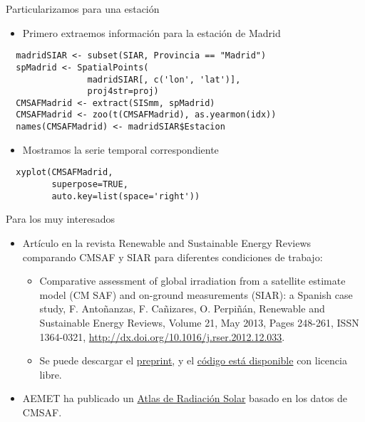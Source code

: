 \documentclass[xcolor={usenames,svgnames,dvipsnames}]{beamer}
\begin{document}
\begin{frame}[fragile,label=sec-4-3]{Particularizamos para una estación}
 \begin{itemize}
\item Primero extraemos información para la estación de Madrid
\end{itemize}
\lstset{language=R,label= ,caption= ,numbers=none}
\begin{lstlisting}
  madridSIAR <- subset(SIAR, Provincia == "Madrid")
  spMadrid <- SpatialPoints(
                madridSIAR[, c('lon', 'lat')],
                proj4str=proj)
  CMSAFMadrid <- extract(SISmm, spMadrid)
  CMSAFMadrid <- zoo(t(CMSAFMadrid), as.yearmon(idx))
  names(CMSAFMadrid) <- madridSIAR$Estacion
\end{lstlisting}
\begin{itemize}
\item Mostramos la serie temporal correspondiente
\end{itemize}
\lstset{language=R,label= ,caption= ,numbers=none}
\begin{lstlisting}
  xyplot(CMSAFMadrid,
         superpose=TRUE,
         auto.key=list(space='right'))
\end{lstlisting}
\end{frame}

\begin{frame}[label=sec-4-4]{Para los muy interesados}
\begin{itemize}
\item Artículo en la revista Renewable and Sustainable Energy Reviews
comparando CMSAF y SIAR para diferentes condiciones de trabajo:
\begin{itemize}
\item Comparative assessment of global irradiation from a satellite
estimate model (CM SAF) and on-ground measurements (SIAR): a
Spanish case study, F. Antoñanzas, F. Cañizares, O. Perpiñán, Renewable
and Sustainable Energy Reviews, Volume 21, May 2013, Pages 248-261,
ISSN 1364-0321, \url{http://dx.doi.org/10.1016/j.rser.2012.12.033}.
\item Se puede descargar el \href{http://procomun.files.wordpress.com/2012/12/cmsaf_siar_rev1.pdf}{preprint}, y el \href{https://github.com/oscarperpinan/CMSAF-SIAR}{código está disponible} con
licencia libre.
\end{itemize}
\item AEMET ha publicado un \href{http://www.aemet.es/es/noticias/2012/05/atlasradiacionsolar}{Atlas de Radiación Solar} basado en los datos
de CMSAF.
\end{itemize}
\end{frame}
\end{document}
